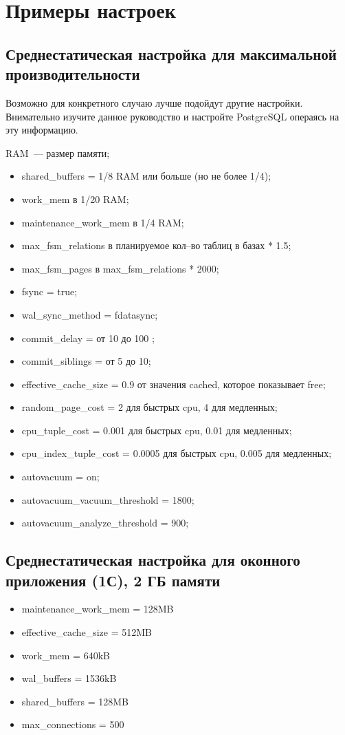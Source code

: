 \section{Примеры настроек}

\subsection{Среднестатическая настройка для максимальной производительности}

Возможно для конкретного случаю лучше подойдут другие настройки. Внимательно изучите данное руководство и настройте 
PostgreSQL операясь на эту информацию.

RAM~--- размер памяти;
\begin{itemize}
\item shared\_buffers = 1/8 RAM или больше (но не более 1/4);
\item work\_mem в 1/20 RAM;
\item maintenance\_work\_mem в 1/4 RAM;
\item max\_fsm\_relations в планируемое кол--во таблиц в базах * 1.5;
\item max\_fsm\_pages в max\_fsm\_relations * 2000;
\item fsync = true;
\item wal\_sync\_method = fdatasync;
\item commit\_delay = от 10 до 100 ;
\item commit\_siblings = от 5 до 10;
\item effective\_cache\_size = 0.9 от значения cached, которое показывает free;
\item random\_page\_cost = 2 для быстрых cpu, 4 для медленных;
\item cpu\_tuple\_cost = 0.001 для быстрых cpu, 0.01 для медленных;
\item cpu\_index\_tuple\_cost = 0.0005 для быстрых cpu, 0.005 для медленных;
\item autovacuum = on;
\item autovacuum\_vacuum\_threshold = 1800;
\item autovacuum\_analyze\_threshold = 900;
\end{itemize}

\subsection{Среднестатическая настройка для оконного приложения (1С), 2 ГБ памяти}

\begin{itemize}
\item maintenance\_work\_mem = 128MB
\item effective\_cache\_size = 512MB
\item work\_mem = 640kB
\item wal\_buffers = 1536kB
\item shared\_buffers = 128MB
\item max\_connections = 500
\end{itemize}

